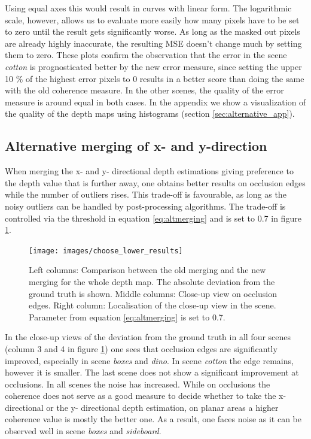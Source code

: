 \documentclass  [
  paper    = a4,
  BCOR     = 10mm,
  twoside,
  fontsize = 12pt,
  fleqn,
  toc      = bibnumbered,
  toc      = listofnumbered,
  numbers  = noendperiod,
  headings = normal,
  listof   = leveldown,
  version  = 3.03
]                                       {scrreprt}
\begin{document}
Using equal axes this would result in curves with linear form. The logarithmic scale, however, allows us to evaluate more easily how many pixels have to be set to zero until the result gets significantly worse. As long as the masked out pixels are already highly inaccurate, the resulting MSE doesn't change much by setting them to zero. These plots confirm the observation that the error in the scene \textit{cotton} is prognosticated better by the new error measure, since setting the upper 10 $\%$ of the highest error pixels to 0 results in a better score than doing the same with the old coherence measure. In the other scenes, the quality of the error measure is around equal in both cases. In the appendix we show a visualization of the quality of the depth maps using histograms (section \ref{sec:alternative_app}).
\subsection{Alternative merging of x- and y-direction}
\label{sec:ev_merging}
When merging the x- and y- directional depth estimations giving preference to the depth value that is further away, one obtains better results on occlusion edges while the number of outliers rises. This trade-off is favourable, as long as the noisy outliers can be handled by post-processing algorithms. The trade-off is controlled via the threshold in equation \ref{eq:altmerging} and is set to 0.7 in figure \ref{fig:chooselowerresults}. 
\begin{figure}[h!]
	\centering
	\texttt{[image: images/choose\_lower\_results]}
	\caption[Results from alternative merging of x- and y- direction]{Left columns: Comparison between the old merging and the new merging for the whole depth map. The absolute deviation from the ground truth is shown. Middle columns: Close-up view on occlusion edges. Right column: Localisation of the close-up view in the scene. Parameter from equation \ref{eq:altmerging} is set to 0.7.}
	\label{fig:chooselowerresults}
\end{figure}
In the close-up views of the deviation from the ground truth in all four scenes (column 3 and 4 in figure \ref{fig:chooselowerresults}) one sees that occlusion edges are significantly improved, especially in scene \textit{boxes} and \textit{dino}. In scene \textit{cotton} the edge remains, however it is smaller. The last scene does not show a significant improvement at occlusions. In all scenes the noise has increased. While on occlusions the coherence does not serve as a good measure to decide whether to take the x-directional or the y- directional depth estimation, on planar areas a higher coherence value is mostly the better one. As a result, one faces noise as it can be observed well in scene \textit{boxes} and \textit{sideboard}. \\
\end{document}
